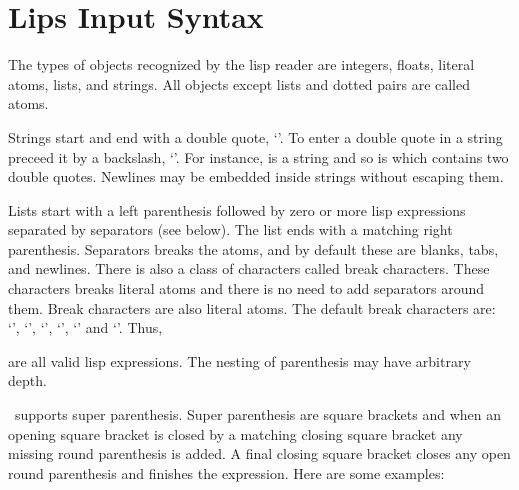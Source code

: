 %
%
%
%
%
\section{Lips Input Syntax}
The types of objects recognized by the lisp reader are integers,
floats, literal atoms, lists, and strings.  All objects except lists
and dotted pairs are called atoms.

Strings start and end with a double quote, `'.  To enter a
double quote in a string preceed it by a backslash, `'.
For instance,  is a string and so is  which contains two double quotes.  Newlines
may be embedded inside strings without escaping them.

Lists start with a left parenthesis followed by zero or more lisp
expressions separated by separators (see below).  The list ends with a
matching right parenthesis.  Separators breaks the atoms, and by
default these are blanks, tabs, and newlines.  There is also a class
of characters called break characters.  These characters breaks
literal atoms and there is no need to add separators around them.
Break characters are also literal atoms.  The default break characters
are: `\lisp{(}', `\lisp{)}', `\lisp{\&}', `\lisp{<}', `\lisp{>}' and
`\lisp{|}'.  Thus,

\begin{quote}
\end{quote}

are all valid lisp expressions.  The nesting of parenthesis may have
arbitrary depth.

\lips\ supports super parenthesis. Super parenthesis are square
brackets and when an opening square bracket is closed by a matching
closing square bracket any missing round parenthesis is added. A final
closing square bracket closes any open round parenthesis and finishes
the expression. Here are some examples:

